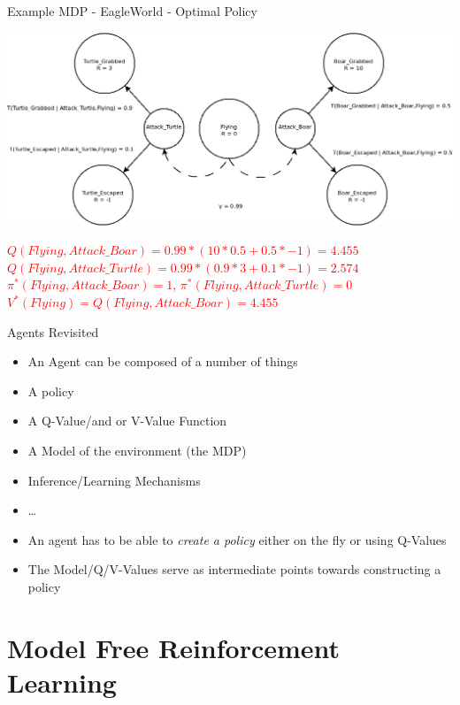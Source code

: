 \documentclass[]{beamer}
\providecommand{\tightlist}{%
  \setlength{\itemsep}{0pt}\setlength{\parskip}{0pt}}
\begin{document}
\begin{frame}{Example MDP - EagleWorld - Optimal Policy}

\includegraphics[scale=0.33]{figures/MDPExample-simple2.png}

\small
\center
\textcolor{red}{
$Q(Flying, Attack\_Boar)   = 0.99 * (10 * 0.5 + 0.5*-1) = 4.455$
$Q(Flying, Attack\_Turtle) = 0.99 * (0.9 * 3 + 0.1*-1) = 2.574$
$\pi^*(Flying, Attack\_Boar) = 1$, $\pi^*(Flying,Attack\_Turtle) = 0$
$V^*(Flying) =  Q(Flying,Attack\_Boar) = 4.455 $
}

\end{frame}

\begin{frame}{Agents Revisited}

\begin{itemize}
\tightlist
\item
  An Agent can be composed of a number of things
\item
  A policy
\item
  A Q-Value/and or V-Value Function
\item
  A Model of the environment (the MDP)
\item
  Inference/Learning Mechanisms
\item
  \ldots{}
\item
  An agent has to be able to \emph{create a policy} either on the fly or
  using Q-Values
\item
  The Model/Q/V-Values serve as intermediate points towards constructing
  a policy
\end{itemize}

\end{frame}

\section{Model Free Reinforcement
Learning}\label{model-free-reinforcement-learning}
\end{document}
